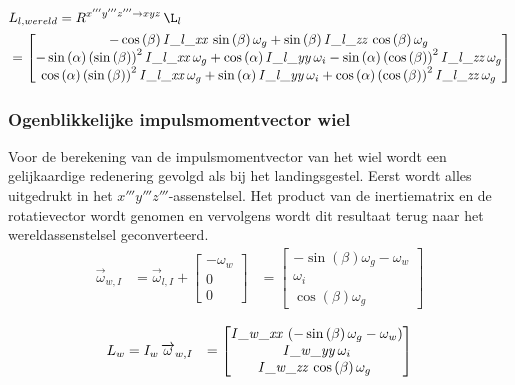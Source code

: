 \begin{align*}
&L_{l,wereld}=R^{x'''y'''z''' \rightarrow xyz}\,\L_{l}\\
&=
\begin{bmatrix}
-\cos \left( \beta \right){\it I\_l\_xx}\,\sin \left( \beta \right) \omega_{g}+\sin \left( \beta \right) {\it 
I\_l\_zz}\,\cos \left( \beta \right) \omega_{g}
\\ 
-\sin \left( \alpha \right)  \left( \sin \left( \beta \right)  \right) 
^{2}{\it I\_l\_xx}\,\omega_{g}+\cos \left( \alpha \right) {\it 
I\_l\_yy}\,\omega_{i}-\sin \left( \alpha \right)  \left( \cos \left( 
\beta \right)  \right) ^{2}{\it I\_l\_zz}\,\omega_{g}
\\ 
\cos \left( \alpha \right)  \left( \sin \left( \beta \right)  \right) ^{2}{\it I\_l\_xx}\,\omega_{g}+\sin \left( \alpha \right) {\it I\_l\_yy}\,\omega_{i}+\cos \left( \alpha \right) \left( \cos \left( \beta \right)  \right) ^{2}{\it I\_l\_zz}\,\omega_
{g}
\end{bmatrix}
\end{align*}

\subsubsection{Ogenblikkelijke impulsmomentvector wiel}
Voor de berekening van de impulsmomentvector van het wiel wordt een gelijkaardige redenering gevolgd als bij het landingsgestel. Eerst wordt alles uitgedrukt in het $x'''y'''z'''$-assenstelsel. Het product van de inertiematrix en de rotatievector wordt genomen en vervolgens wordt dit resultaat terug naar het wereldassenstelsel geconverteerd.
\begin{equation*}
\begin{split}
\overrightarrow{\omega}_{w,I}
&=\overrightarrow{\omega}_{l,I}+
\begin{bmatrix}
-\omega_{w}\\
0\\
0\
\end{bmatrix}
&=\begin{bmatrix}
-\sin \left( \beta \right) \omega_{g}-\omega
_{w}\\
\omega_{i}\\
\cos \left( 
\beta \right) \omega_{g}\
\end{bmatrix}
\end{split}
\end{equation*}

\begin{equation}
\begin{split}
L_{w}&=I_{w}\,\overrightarrow{\omega}_{w,I}&=
\begin{bmatrix}
{\it I\_w\_xx}\, \left( -\sin \left( \beta
 \right) \omega_{g}-\omega_{w} \right) \\
{\it 
I\_w\_yy}\,\omega_{i}\\
{\it I\_w\_zz}\,\cos \left( 
\beta \right) \omega_{g}\
\end{bmatrix}
\end{split}
\end{equation}

